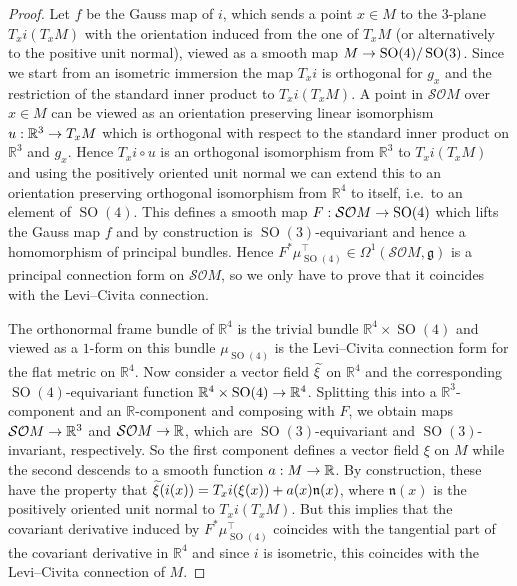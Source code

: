 \documentclass[10pt,a4paper]{amsart}
\newcommand{\x}{\times}
\renewcommand{\o}{\circ}
\newcommand{\Om}{\Omega}
\DeclareMathOperator{\SO}{SO}
\newcommand*{\R}{\mathbb{R}}
\newcommand{\fkg}{\mathfrak{g}}
\newcommand{\fkn}{\mathfrak{n}}
\newcommand{\clSO}{\mathcal{SO}}
\renewcommand*{\to}{\mathchoice{\longrightarrow}{\rightarrow}{\rightarrow}{\rightarrow}}
\let\oldtilde\tilde
\renewcommand*{\tilde}[1]{\mathchoice{\widetilde{#1}}{\widetilde{#1}}{\oldtilde{#1}}{\oldtilde{#1}}}
\theoremstyle{definition}\newtheorem{defi}[theo]{Definition}
\begin{document}
\begin{proof}
Let $f$ be the Gauss map of $i$, which sends a point $x\in M$ to the $3$-plane $T_xi(T_xM)$ with the orientation induced from the one of $T_xM$ (or alternatively to the positive unit normal), viewed as a smooth map $M\to
\SO(4)/\SO(3)$. Since we start from an isometric immersion the map $T_xi$ is orthogonal for $g_x$ and the restriction of the standard inner product to $T_xi(T_xM)$. A point in $\clSO M$ over $x\in M$ can be viewed as an orientation preserving linear isomorphism $u: \R^3\to T_xM$ which is orthogonal with respect to the standard inner product on $\R^3$ and $g_x$. Hence $T_xi\o u$ is an orthogonal isomorphism from $\R^3$ to $T_xi(T_xM)$ and using the positively oriented unit normal we can extend this to an orientation preserving orthogonal isomorphism from $\R^4$ to itself, i.e.\ to an element of $\SO(4)$. This defines a smooth map $F:
\clSO M\to \SO(4)$ which lifts the Gauss map $f$ and by construction is $\SO(3)$-equivariant and hence a homomorphism of principal bundles. Hence $F^*\mu_{\SO(4)}^\top\in\Om^1(\clSO M,\fkg)$ is a principal connection form on $\clSO M$, so we only have to prove that it coincides with the Levi--Civita connection.

The orthonormal frame bundle of $\R^4$ is the trivial bundle $\R^4\x \SO(4)$ and viewed as a $1$-form on this bundle $\mu_{\SO(4)}$ is the Levi--Civita connection form for the flat metric on $\R^4$. Now consider a vector field $\tilde\xi$ on $\R^4$ and the corresponding $\SO(4)$-equivariant function $\R^4\x \SO(4)\to\R^4$. Splitting this into a $\R^3$-component and an $\R$-component and composing with $F$, we obtain maps $\clSO M\to\R^3$ and $\clSO M\to\R$, which are $\SO(3)$-equivariant and $\SO(3)$-invariant, respectively. So the first component defines a vector field $\xi$ on $M$ while the second descends to a smooth function $a: M\to\R$. By construction, these have the property that $\tilde\xi(i(x))=T_xi(\xi(x))+a(x)\fkn(x)$, where $\fkn(x)$ is the positively oriented unit normal to $T_xi(T_xM)$. But this implies that the covariant derivative induced by $F^*\mu_{\SO(4)}^\top$ coincides with the tangential part of the covariant derivative in $\R^4$ and since $i$ is isometric, this coincides with the Levi--Civita connection of $M$.
\end{proof}
\end{document}
